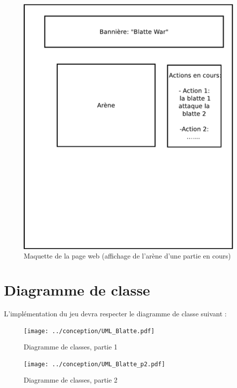 \begin{figure}[h!]
\begin{center}
\includegraphics[width=.8\linewidth]{images/mockup.pdf}
\caption{Maquette de la page web (affichage de l'arène d'une partie en cours)}
\end{center}
\end{figure}


    
\newpage
\section{Diagramme de classe}
    L'implémentation du jeu devra respecter le diagramme de classe suivant :

    \begin{figure}[ht]
    \begin{center}
    \texttt{[image: ../conception/UML\_Blatte.pdf]}
    \end{center}
    \caption{Diagramme de classes, partie 1}
    \end{figure}

    \begin{figure}[ht]
    \begin{center}
    \texttt{[image: ../conception/UML\_Blatte\_p2.pdf]}
    \end{center}
    \caption{Diagramme de classes, partie 2}
    \end{figure}

